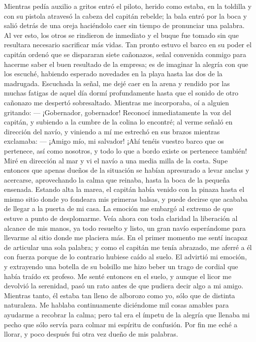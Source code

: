 \documentclass{novela}
\begin{document}
    Mientras pedía auxilio a gritos entró el piloto, herido como estaba, en la toldilla y con su pistola atravesó la cabeza del capitán rebelde; la bala entró por la boca y salió detrás de una oreja haciéndolo caer sin tiempo de pronunciar una palabra.
    Al ver esto, los otros se rindieron de inmediato y el buque fue tomado sin que resultara necesario sacrificar más vidas.
    Tan pronto estuvo el barco en su poder el capitán ordenó que se dispararan siete cañonazos, señal convenida conmigo para hacerme saber el buen resultado de la empresa; es de imaginar la alegría con que los escuché, habiendo esperado novedades en la playa hasta las dos de la madrugada.
    Escuchada la señal, me dejé caer en la arena y rendido por las muchas fatigas de aquel día dormí profundamente hasta que el sonido de otro cañonazo me despertó sobresaltado. Mientras me incorporaba, oí a alguien gritando:
    — ¡Gobernador, gobernador!
    Reconocí inmediatamente la voz del capitán, y subiendo a la cumbre de la colina lo encontré; al verme señaló en dirección del navío, y viniendo a mí me estrechó en sus brazos mientras exclamaba:
    — ¡Amigo mío, mi salvador! ¡Ahí tenéis vuestro barco que os pertenece, así como nosotros, y todo lo que a bordo existe os pertenece también!
    Miré en dirección al mar y vi el navío a una media milla de la costa. Supe entonces que apenas dueños de la situación se habían apresurado a levar anclas y acercarse, aprovechando la calma que reinaba, hasta la boca de la pequeña ensenada. Estando alta la marea, el capitán había venido con la pinaza hasta el mismo sitio donde yo fondeara mis primeras balsas, y puede decirse que acababa de llegar a la puerta de mi casa.
    La emoción me embargó al extremo de que estuve a punto de desplomarme. Veía ahora con toda claridad la liberación al alcance de mis manos, ya todo resuelto y listo, un gran navío esperándome para llevarme al sitio donde me placiera más.
    En el primer momento me sentí incapaz de articular una sola palabra; y como el capitán me tenía abrazado, me aferré a él con fuerza porque de lo contrario hubiese caído al suelo.
    El advirtió mi emoción, y extrayendo una botella de su bolsillo me hizo beber un trago de cordial que había traído ex profeso. Me senté entonces en el suelo, y aunque el licor me devolvió la serenidad, pasó un rato antes de que pudiera decir algo a mi amigo.
    Mientras tanto, él estaba tan lleno de alborozo como yo, sólo que de distinta naturaleza. Me hablaba continuamente diciéndome mil cosas amables para ayudarme a recobrar la calma; pero tal era el ímpetu de la alegría que llenaba mi pecho que sólo servía para colmar mi espíritu de confusión. Por fin me eché a llorar, y poco después fui otra vez dueño de mis palabras.
\end{document}
